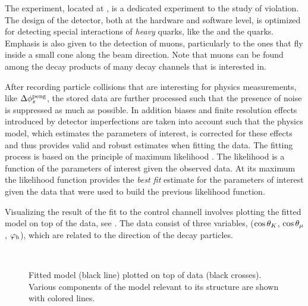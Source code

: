 The \lhcb experiment, located at \cern, is a dedicated experiment to the study of \CP violation.
The design of the detector, both at the hardware and software level, is optimized for detecting
special interactions of {\it heavy} quarks, like the \bquark and the \cquark quarks.
Emphasis is also given to the detection of muons, particularly to the ones that fly
inside a small cone along the beam direction. Note that muons can be found among the decay
products of many decay channels that \lhcb is interested in.

After recording particle collisions that are interesting for physics measurements, like $\Delta\phi_{s}^{\tiny\text{peng}}$,
the stored data are further processed such that the presence of noise is suppressed as much
as possible. In addition biases and finite resolution effects introduced by detector imperfections are
taken into account such that the physics model, which estimates the parameters of interest, is
corrected for these effects and thus provides valid and robust estimates when fitting the data.
The fitting process is based on the principle of maximum likelihood \cite{cowan1998statistical}.
The likelihood is a function of the parameters of interest given the observed data.
At its maximum the likelihood function provides the {\it best fit} estimate for the parameters
of interest given the data that were used to build the previous likelihood function.

Visualizing the result of the fit to the \BsJpsiKst control channell involves plotting the fitted model on top of the data,
see . The data consist of three variables,
($\cos\theta_{K}$, $\cos\theta_{\mu}$, $\varphi_{\rm h}$), which are related to the direction of the \BsJpsiKst decay particles.

\begin{figure}[!t]
  \begin{subfigure}{0.5\textwidth}
    \centering
    \scalebox{1.2}{}
  \end{subfigure}%
  \hfill
  \begin{subfigure}{0.5\textwidth}
    \centering
    \scalebox{1.2}{}
  \end{subfigure}\\
  \begin{subfigure}{\textwidth}
    \centering
    \scalebox{1.2}{}
  \end{subfigure}
  \caption{Fitted model (black line) plotted on top of \BsJpsiKst data (black crosses).
           Various components of the model relevant to its \CP structure are shown with colored lines.}
  \label{app_angular_plot_thetas}
\end{figure}

